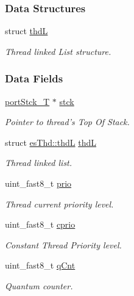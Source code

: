 \subsubsection*{Data Structures}
\begin{DoxyCompactItemize}
\item 
struct \hyperlink{structesThd_1_1thdL}{thd\-L}
\begin{DoxyCompactList}\small\item\em Thread linked List structure. \end{DoxyCompactList}\end{DoxyCompactItemize}
\subsubsection*{Data Fields}
\begin{DoxyCompactItemize}
\item 
\hyperlink{group__template__cpu__intf_ga13cc91970e3e05fe4210440c068d3f4a}{port\-Stck\-\_\-\-T} $\ast$ \hyperlink{structesThd_a5a7906c650bc81f3f0639f6f8565316b}{stck}
\begin{DoxyCompactList}\small\item\em Pointer to thread's Top Of Stack. \end{DoxyCompactList}\item 
struct \hyperlink{structesThd_1_1thdL}{es\-Thd\-::thd\-L} \hyperlink{structesThd_aacfdf777fcd4619fdcc33c2e57d4810c}{thd\-L}
\begin{DoxyCompactList}\small\item\em Thread linked list. \end{DoxyCompactList}\item 
uint\-\_\-fast8\-\_\-t \hyperlink{structesThd_a8d1877cabc7d4e637f96f4b4d5b0da09}{prio}
\begin{DoxyCompactList}\small\item\em Thread current priority level. \end{DoxyCompactList}\item 
uint\-\_\-fast8\-\_\-t \hyperlink{structesThd_aae7431d7fca3051dff47aaf4b9f7c855}{cprio}
\begin{DoxyCompactList}\small\item\em Constant Thread Priority level. \end{DoxyCompactList}\item 
uint\-\_\-fast8\-\_\-t \hyperlink{structesThd_a5721e76b02321c6701e52a9788d9bf1e}{q\-Cnt}
\begin{DoxyCompactList}\small\item\em Quantum counter. \end{DoxyCompactList}\item 

\end{DoxyCompactItemize}
